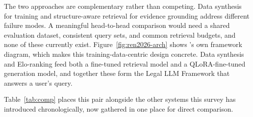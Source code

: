 The two approaches are complementary rather than competing. Data synthesis for training and
structure-aware retrieval for evidence grounding address different failure modes. A meaningful
head-to-head comparison would need a shared evaluation dataset, consistent query sets, and common
retrieval budgets, and none of these currently exist. Figure~\ref{fig:ren2026-arch} shows
\citeauthor{ren2026}'s own framework diagram, which makes this training-data-centric design
concrete. Data synthesis and Elo-ranking feed both a fine-tuned retrieval model and a
QLoRA-fine-tuned generation model, and together these form the Legal LLM Framework that answers a
user's query.



Table~\ref{tab:comp} places this pair alongside the other systems this survey has introduced
chronologically, now gathered in one place for direct comparison.

